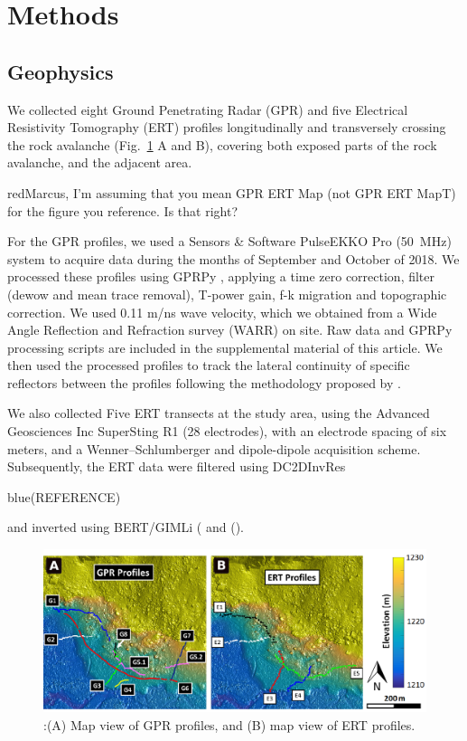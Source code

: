 \documentclass[5p]{elsarticle}
\newcommand{\COMON}{\begin{color}{blue}}
\newcommand{\COMOFF}{\end{color}}
\newcommand{\alon}{\begin{color}{red}}
\newcommand{\aloff}{\end{color}}
\begin{document}
\bigskip   



\section{Methods}

\subsection{Geophysics}

We collected eight Ground Penetrating Radar
    (GPR) and five Electrical Resistivity Tomography (ERT) profiles
    longitudinally and transversely crossing the rock avalanche
    (Fig.~\ref{GPR_ERT_Map} A and B), covering both exposed parts of the rock
    avalanche, and the adjacent area.\alon Marcus, I'm assuming that
    you mean GPR ERT Map (not GPR ERT MapT) for the figure you
    reference. Is that right? \aloff

For the GPR profiles, we used a Sensors \& Software PulseEKKO Pro (\SI{50}{\mega Hz}) system to acquire data during the months of September and October of 2018. We processed these profiles using GPRPy \citep{plattner2019comunity,Plattner2019}, applying a time zero correction, filter (dewow and mean trace removal), T-power gain, f-k migration \citep{stolt1978migration} and topographic correction. We used 0.11 m/ns wave velocity, which we obtained from a Wide Angle Reflection and Refraction survey (WARR) on site. Raw data and GPRPy processing scripts are included in the supplemental material of this article. We then used the processed profiles to track the lateral continuity of specific reflectors between the profiles following the methodology proposed by \citep{mitchum1977seismic}.

We also collected Five ERT transects at the study area, using the Advanced Geosciences Inc SuperSting R1 (28 electrodes), with an electrode spacing of six meters, and a Wenner–Schlumberger and dipole-dipole acquisition scheme. Subsequently, the ERT data were filtered using DC2DInvRes \COMON (REFERENCE) \COMOFF and inverted using BERT/GIMLi (\cite{gunther2006three} and (\cite{Ruecker2017}).


								 \begin{figure}[h]

	\includegraphics[width=\textwidth]{Figures/GPR_ERT_Map.pdf}
		\caption{:(A) Map view of GPR profiles, and (B) map view of ERT profiles. \label{GPR_ERT_Map}}

								   \end{figure}
\end{document}
